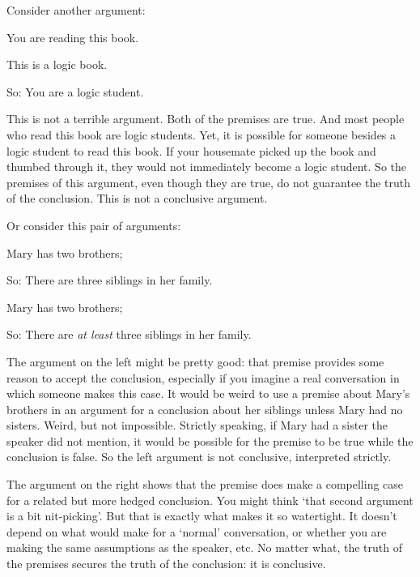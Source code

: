 Consider another argument:
	\begin{earg}
		\item[] You are reading this book.
		\item[] This is a logic book.
		\item[So:] You are a logic student.
	\end{earg}
This is not a terrible argument. Both of the premises are true. And most people who read this book are logic students. Yet, it is possible for someone besides a logic student to read this book. If your housemate picked up the book and thumbed through it, they would not immediately become a logic student. So the premises of this argument, even though they are true, do not guarantee the truth of the conclusion. This is not a conclusive argument.

Or consider this pair of arguments:

	\begin{minipage}{0.45\textwidth}
\begin{earg}
	\item [] Mary has two brothers;
		\item[So:] There are three siblings in her family. 
	\end{earg}\end{minipage}\qquad\begin{minipage}{0.45\textwidth}
		\begin{earg}
		\item [] Mary has two brothers;
		\item[So:] There are \emph{at least} three siblings in her family. 
	\end{earg}
	\end{minipage}

The argument on the left might be pretty good: that premise provides some reason to accept the conclusion, especially if you imagine a real conversation in which someone makes this case. It would be weird to use a premise about Mary's brothers in an argument for a conclusion about her siblings unless Mary had no sisters. Weird, but not impossible. Strictly speaking, if Mary had a sister the speaker did not mention, it would be possible for the premise to be true while the conclusion is false. So the left argument is not conclusive, interpreted strictly.

The argument on the right shows that the premise does make a compelling case for a related but more hedged conclusion. You might think `that second argument is a bit nit-picking'. But that is exactly what makes it so watertight.  It doesn't depend on what would make for a `normal' conversation, or whether you are making the same assumptions as the speaker, etc. No matter what, the truth of the premises secures the truth of the conclusion: it is conclusive.

